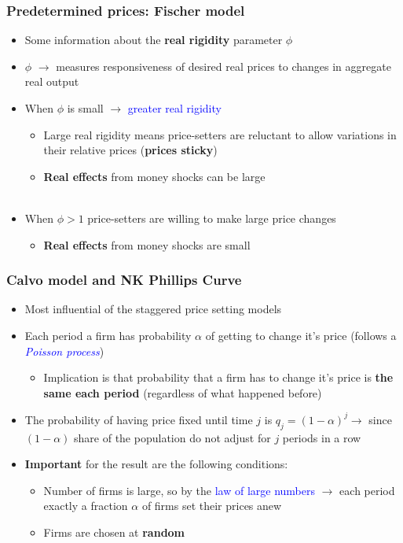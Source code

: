 \documentclass[10pt, xcolor=x11names, table]{beamer}
\begin{document}
\begin{frame}
\frametitle{Predetermined prices: Fischer model}
\begin{itemize}
\item Some information about the \textbf{real rigidity} parameter $\phi$
\item $\phi$ $\rightarrow$ measures responsiveness of desired real prices to changes in aggregate real output
\item When $\phi$ is small $\rightarrow$ \textcolor{blue}{greater real rigidity}
\begin{itemize}
  \item Large real rigidity means price-setters are reluctant to allow variations in their relative prices (\textbf{prices sticky})
  \item \textbf{Real effects} from money shocks can be large \\~\\
\end{itemize}
\item When $\phi>1$ price-setters are willing to make large price changes
\begin{itemize}
  \item \textbf{Real effects} from money shocks are small
\end{itemize}
\end{itemize}
\end{frame}

\begin{frame}
\frametitle{Calvo model and NK Phillips Curve}
\begin{itemize}
\item Most influential of the staggered price setting models
\item Each period a firm has probability $\alpha$ of getting to change it's price (follows a \emph{\textcolor{blue}{Poisson process}})
\begin{itemize}
\item Implication is that probability that a firm has to change it's price is \textbf{the same each period} (regardless of what happened before)
\end{itemize}
\item The probability of having price fixed until time $j$ is $q_{j} = (1-\alpha)^{j} \rightarrow$ since $(1-\alpha)$ share of the population do not adjust for $j$ periods in a row
\item \textbf{Important} for the result are the following conditions:
\begin{itemize}
  \item Number of firms is large, so by the \textcolor{blue}{law of large numbers} $\rightarrow$ each period exactly a fraction $\alpha$ of firms set their
  prices anew
  \item Firms are chosen at \textbf{random}
\end{itemize}
\end{itemize}
\end{frame}
\end{document}
